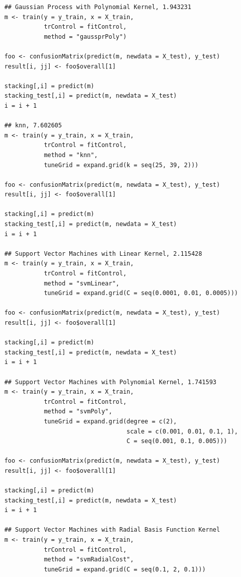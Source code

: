\documentclass[11pt,oneside,a4paper]{article}
\begin{document}
\begin{verbatim}
    ## Gaussian Process with Polynomial Kernel, 1.943231
    m <- train(y = y_train, x = X_train,
               trControl = fitControl,
               method = "gaussprPoly")
    
    foo <- confusionMatrix(predict(m, newdata = X_test), y_test)
    result[i, jj] <- foo$overall[1]
    
    stacking[,i] = predict(m)
    stacking_test[,i] = predict(m, newdata = X_test)
    i = i + 1
    
    ## knn, 7.602605
    m <- train(y = y_train, x = X_train,
               trControl = fitControl,
               method = "knn",
               tuneGrid = expand.grid(k = seq(25, 39, 2)))
    
    foo <- confusionMatrix(predict(m, newdata = X_test), y_test)
    result[i, jj] <- foo$overall[1]
    
    stacking[,i] = predict(m)
    stacking_test[,i] = predict(m, newdata = X_test)
    i = i + 1
    
    ## Support Vector Machines with Linear Kernel, 2.115428
    m <- train(y = y_train, x = X_train,
               trControl = fitControl,
               method = "svmLinear", 
               tuneGrid = expand.grid(C = seq(0.0001, 0.01, 0.0005)))
    
    foo <- confusionMatrix(predict(m, newdata = X_test), y_test)
    result[i, jj] <- foo$overall[1]
    
    stacking[,i] = predict(m)
    stacking_test[,i] = predict(m, newdata = X_test)
    i = i + 1
    
    ## Support Vector Machines with Polynomial Kernel, 1.741593
    m <- train(y = y_train, x = X_train,
               trControl = fitControl,
               method = "svmPoly", 
               tuneGrid = expand.grid(degree = c(2), 
                                      scale = c(0.001, 0.01, 0.1, 1), 
                                      C = seq(0.001, 0.1, 0.005)))
    
    foo <- confusionMatrix(predict(m, newdata = X_test), y_test)
    result[i, jj] <- foo$overall[1]
    
    stacking[,i] = predict(m)
    stacking_test[,i] = predict(m, newdata = X_test)
    i = i + 1
    
    ## Support Vector Machines with Radial Basis Function Kernel
    m <- train(y = y_train, x = X_train,
               trControl = fitControl,
               method = "svmRadialCost",
               tuneGrid = expand.grid(C = seq(0.1, 2, 0.1)))
    

\end{verbatim}
\end{document}
